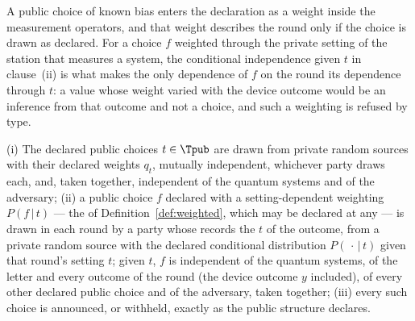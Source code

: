 
A public choice of known bias enters the declaration as a weight inside the
measurement operators, and that weight describes the round only if the choice
is drawn as declared. For a choice $f$ weighted through the private setting
of the station that measures a system, the conditional independence given $t$
in clause~(ii) is what makes the only dependence of $f$ on the round its
dependence through $t$: a value whose weight varied with the device outcome
would be an inference from that outcome and not a choice, and such a
weighting is refused by type.

\begin{assumption}\label{ass:coin}
(i) The declared public choices $t\in\Tpub$ are drawn from private random
sources with their declared weights $q_t$, mutually independent, whichever
party draws each, and, taken together, independent of the quantum systems and
of the adversary;
(ii) a public choice $f$ declared with a setting-dependent weighting
$P(f\,|\,t)$ --- the  of
Definition~\ref{def:weighted}, which may be declared at any
 --- is drawn in each round by a party whose
 records the  $t$ of the
outcome, from a private random source with the declared conditional
distribution $P(\,\cdot\,|\,t)$ given that round's setting $t$; given $t$,
$f$ is independent of the quantum systems, of the letter and every outcome of
the round (the device outcome $y$ included), of every other declared public
choice and of the adversary, taken together;
(iii) every such choice is announced, or withheld, exactly as the public
structure declares.
\end{assumption}
